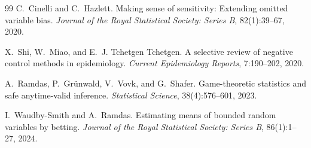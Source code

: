 \documentclass[11pt]{article}
\theoremstyle{definition}
\theoremstyle{remark}
\begin{document}
\begin{thebibliography}{99}
C.~Cinelli and C.~Hazlett.
\newblock Making sense of sensitivity: Extending omitted variable bias.
\newblock \emph{Journal of the Royal Statistical Society: Series B},
82(1):39--67, 2020.

X.~Shi, W.~Miao, and E.~J. Tchetgen Tchetgen.
\newblock A selective review of negative control methods in epidemiology.
\newblock \emph{Current Epidemiology Reports}, 7:190--202, 2020.

A.~Ramdas, P.~Gr\"unwald, V.~Vovk, and G.~Shafer.
\newblock Game-theoretic statistics and safe anytime-valid inference.
\newblock \emph{Statistical Science}, 38(4):576--601, 2023.

I.~Waudby-Smith and A.~Ramdas.
\newblock Estimating means of bounded random variables by betting.
\newblock \emph{Journal of the Royal Statistical Society: Series B},
86(1):1--27, 2024.

\end{thebibliography}
\end{document}
